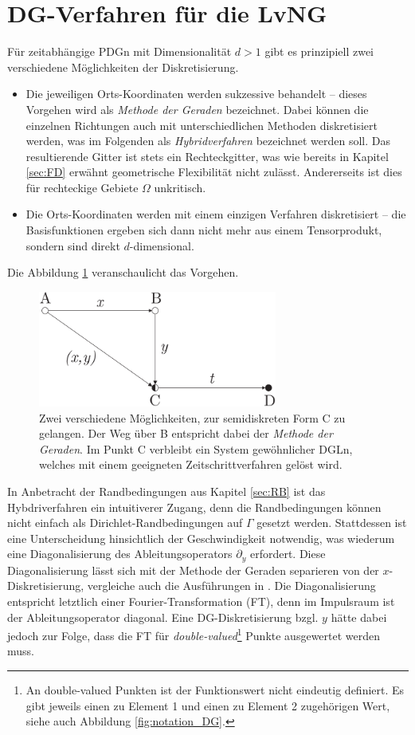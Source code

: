 \section{DG-Verfahren für die LvNG}
Für zeitabhängige PDGn mit Dimensionalität $d>1$ gibt es prinzipiell zwei verschiedene Möglichkeiten der Diskretisierung.
\begin{itemize}
  \item Die jeweiligen Orts-Koordinaten werden sukzessive behandelt -- dieses Vorgehen wird als \emph{Methode der Geraden} bezeichnet. Dabei können die einzelnen Richtungen auch mit unterschiedlichen Methoden diskretisiert werden, was im Folgenden als \emph{Hybridverfahren} bezeichnet werden soll. Das resultierende Gitter ist stets ein Rechteckgitter, was wie bereits in Kapitel \ref{sec:FD} erwähnt geometrische Flexibilität nicht zulässt. Andererseits ist dies für rechteckige Gebiete $\Omega$ unkritisch.
  \item Die Orts-Koordinaten werden mit einem einzigen Verfahren diskretisiert -- die Basisfunktionen ergeben sich dann nicht mehr aus einem Tensorprodukt, sondern sind direkt $d$-dimensional.
\end{itemize}
Die Abbildung \ref{fig:methodeDerGeraden} veranschaulicht das Vorgehen.
\begin{figure}
  \centering
  \includegraphics[width=0.7\textwidth]{files/methodeDerGeraden.pdf}
  \caption{Zwei verschiedene Möglichkeiten, zur semidiskreten Form C zu gelangen. Der Weg über B entspricht dabei der \emph{Methode der Geraden}. Im Punkt C verbleibt ein System gewöhnlicher DGLn, welches mit einem geeigneten Zeitschrittverfahren gelöst wird.}
  \label{fig:methodeDerGeraden}
\end{figure}
In Anbetracht der Randbedingungen aus Kapitel \ref{sec:RB} ist das Hybdriverfahren ein intuitiverer Zugang, denn die Randbedingungen können nicht einfach als Dirichlet-Randbedingungen auf $\Gamma$ gesetzt werden. Stattdessen ist eine Unterscheidung hinsichtlich der Geschwindigkeit notwendig, was wiederum eine Diagonalisierung des Ableitungsoperators $\partial_y$ erfordert. Diese Diagonalisierung lässt sich mit der Methode der Geraden separieren von der $x$-Diskretisierung, vergleiche auch die Ausführungen in \cite{lukas1}. Die Diagonalisierung entspricht letztlich einer Fourier-Transformation (FT), denn im Impulsraum ist der Ableitungsoperator  diagonal. Eine DG-Diskretisierung bzgl. $y$ hätte dabei jedoch zur Folge, dass die FT für \emph{double-valued}\footnote{An double-valued Punkten ist der Funktionswert nicht eindeutig definiert. Es gibt jeweils einen zu Element 1 und einen zu Element 2 zugehörigen Wert, siehe auch Abbildung \ref{fig:notation_DG}.} Punkte ausgewertet werden muss.

